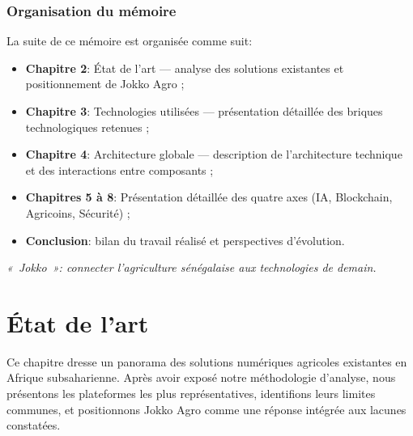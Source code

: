 \documentclass[12pt,a4paper]{report}
\begin{document}
\vspace{0.2cm}

\subsection{Organisation du mémoire}

\noindent
La suite de ce mémoire est organisée comme suit:
\begin{itemize}
  \item \textbf{Chapitre 2}: État de l'art — analyse des solutions existantes et positionnement de Jokko Agro ;
  \item \textbf{Chapitre 3}: Technologies utilisées — présentation détaillée des briques technologiques retenues ;
  \item \textbf{Chapitre 4}: Architecture globale — description de l'architecture technique et des interactions entre composants ;
  \item \textbf{Chapitres 5 à 8}: Présentation détaillée des quatre axes (IA, Blockchain, Agricoins, Sécurité) ;
  \item \textbf{Conclusion}: bilan du travail réalisé et perspectives d'évolution.
\end{itemize}

\vspace{0.5cm}
\begin{flushright}
  \textit{«~Jokko~»: connecter l'agriculture sénégalaise aux technologies de demain.}
\end{flushright}

\chapter{État de l'art}

\begin{tcolorbox}[chapterbox,title={Vue d'ensemble du chapitre}]
  Ce chapitre dresse un panorama des solutions numériques agricoles existantes en Afrique
  subsaharienne. Après avoir exposé notre méthodologie d'analyse, nous présentons les
  plateformes les plus représentatives, identifions leurs limites communes, et positionnons
  Jokko Agro comme une réponse intégrée aux lacunes constatées.
\end{tcolorbox}

\vspace{0.5cm}
\end{document}
